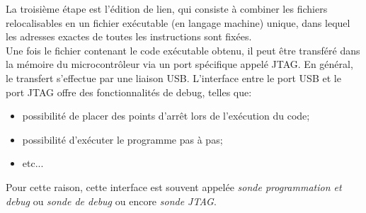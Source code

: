 La troisième étape est l'édition de lien, qui consiste à combiner les fichiers relocalisables en un fichier exécutable (en langage machine) unique, dans lequel les adresses exactes de toutes les instructions sont fixées.\\

Une fois le fichier contenant le code exécutable obtenu, il peut être transféré dans la mémoire du microcontrôleur via un port spécifique appelé JTAG.  En général, le transfert s'effectue par une liaison USB. L'interface entre le port USB et le port JTAG offre des fonctionnalités de debug, telles que:
\begin{itemize}[label=\textbullet,font=\small]
\item possibilité de placer des points d'arrêt lors de l'exécution du code;
\item possibilité d'exécuter le programme pas à pas;
\item etc...
\end{itemize}
Pour cette raison, cette interface est souvent appelée \textit{sonde programmation et debug} ou \textit{sonde de debug} ou encore \textit{sonde JTAG}.
